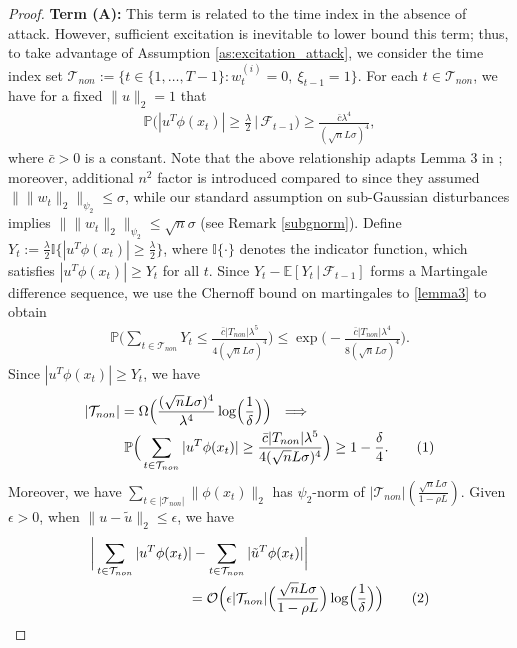 \documentclass[letterpaper,10pt,conference]{ieeeconf}
\newcommand\numberthis{\addtocounter{equation}{1}\tag{\theequation}}
\theoremstyle{plain} %
\theoremstyle{plain} %
\theoremstyle{plain} %
\theoremstyle{plain}
\begin{document}
\begin{proof}
\medskip
\textbf{Term (A):} This term is related to the time index in the absence of attack. However, sufficient excitation  is inevitable to lower bound this term; thus, to take advantage of Assumption \ref{as:excitation_attack}, we  consider the time index set $\mathcal{T}_{non}:= \{t\in\{1,\dots, T-1\}: w_t^{(i)}= 0, ~\xi_{t-1}= 1\}$.  For each $t\in\mathcal{T}_{non}$, we have for a fixed $\|u\|_2=1$ that 
\begin{align}\label{lemma3}
    \mathbb{P}\Bigr(  |u^T \phi(x_t)| \ge \frac{\lambda}{2}\, \Bigr|\,\mathcal{F}_{t-1}  \Bigr) \ge \frac{\bar c \lambda^4}{ (\sqrt{n} L \sigma)^4},
\end{align}
where $\bar c >0$ is a constant. Note that the above relationship adapts Lemma 3 in \cite{zhang2024exact}; moreover, additional $n^2$ factor is introduced compared to \cite{zhang2024exact} since they assumed $\| \|w_t\|_2 \|_{\psi_2} \le \sigma$, while our standard assumption on sub-Gaussian disturbances implies $\| \|w_t\|_2 \|_{\psi_2} \le \sqrt{n}\sigma$ (see Remark \ref{subgnorm}). Define $Y_t := \frac{\lambda}{2}\mathbb{I}\{|u^T \phi(x_t)| \ge \frac{\lambda}{2}\}$, where $\mathbb{I}\{\cdot\}$ denotes the indicator function, which satisfies $|u^T \phi(x_t)| \ge Y_t$ for all $t$.  
Since $Y_t-\mathbb{E}[Y_t\,|\,\mathcal{F}_{t-1}]$ forms a Martingale difference sequence,  we use 
the Chernoff bound on martingales to \eqref{lemma3} to obtain 
\begin{align*}
    \mathbb{P}\Bigr( \sum_{t\in \mathcal{T}_{non}}Y_t \le \frac{\bar c |T_{non}|\lambda^5}{4(\sqrt{n}L\sigma)^4} \Bigr)\le \exp\Bigr(- \frac{\bar c |T_{non}|\lambda^4}{8(\sqrt{n}L\sigma)^4}\Bigr).
\end{align*}
 Since $|u^T\phi(x_t)|\ge Y_t$, we have 
\begin{align*}
  &  |\mathcal{T}_{non}| = \Omega\Bigr( \frac{(\sqrt{n}L\sigma)^4}{\lambda^4}\log\Bigr(\frac{1}{\delta}\Bigr) \Bigr) ~~\Longrightarrow \\&\hspace{10mm}\mathbb{P}\Bigr(\sum_{t\in \mathcal{T}_{non}}|u^T\phi(x_t)|\ge \frac{\bar c |T_{non}|\lambda^5}{4(\sqrt{n}L\sigma)^4}\Bigr)\ge 1-\frac{\delta}{4}.\numberthis\label{termainter}
\end{align*}
Moreover, we have $\sum_{t\in |\mathcal{T}_{non}|} \|\phi(x_t)\|_2$ has $\psi_2$-norm of $|\mathcal{T}_{non}|(\frac{\sqrt{n}L \sigma}{1-\rho L})$. Given $\epsilon>0$, when $\|u-\tilde u\|_2\le \epsilon$,  
we have 
\begin{align*}
   \biggr| \sum_{t\in \mathcal{T}_{non}}|u^T\phi(x_t)&|-  \sum_{t\in \mathcal{T}_{non}}|\tilde u^T\phi(x_t)|\biggr|\\&=\mathcal{O}\Bigr( \epsilon |\mathcal{T}_{non}|\Bigr(\frac{\sqrt{n}L \sigma}{1-\rho L}\Bigr)\log\Bigr( \frac{1}{\delta}\Bigr)\Bigr)\numberthis\label{termainter2}

\end{align*}
\end{proof}
\end{document}

